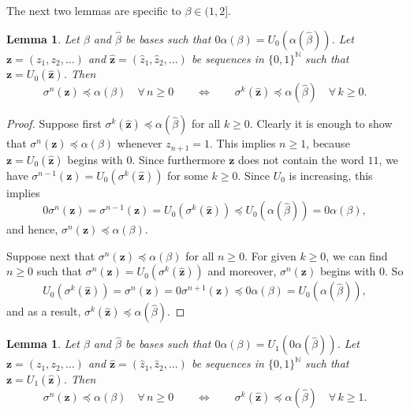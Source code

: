 \documentclass[11pt]{amsart}
\newtheorem{lemma}[theorem]{Lemma}
\theoremstyle{definition}
\theoremstyle{remark}
\numberwithin{equation}{section}
\newcommand{\N}{\ensuremath{\mathbb{N}}}
\newcommand{\z}{\mathbf{z}}
\newcommand{\al}{\alpha}
\newcommand{\lle}{\preccurlyeq}
\newcommand{\si}{\sigma}
\begin{document}
{The next two lemmas are specific to $\beta\in(1,2]$.}

\begin{lemma} \label{lem:upper-bound-equivalence-xi}
Let $\beta$ and $\hat{\beta}$ be bases such that $0\al(\beta)=U_0(\al(\hat{\beta}))$.
Let $\z=(z_1,z_2,\dots)$ and $\hat{\z}=(\hat{z}_1,\hat{z}_2,\dots)$ be sequences in $\{0,1\}^\N$ such that $\z=U_0(\hat{\z})$. Then
\[
\si^n(\z)\lle\alpha(\beta) \quad \forall\,n\geq 0 \qquad \Longleftrightarrow \qquad \si^k(\hat{\z})\lle\alpha(\hat{\beta}) \quad \forall\,k\geq 0.
\]
\end{lemma}

\begin{proof}
Suppose first $\si^k(\hat{\z})\lle\alpha(\hat{\beta})$ for all $k\geq 0$. Clearly it is enough to show that $\si^n(\z)\lle\alpha(\beta)$ whenever $z_{n+1}=1$. This implies $n\geq 1$, because $\z=U_0(\hat{\z})$ begins with $0$. Since furthermore $\z$ does not contain the word $11$, we have $\si^{n-1}(\z)=U_0(\si^k(\hat{\z}))$ for some $k\geq 0$. Since $U_0$ is increasing, this implies
\[
0\si^n(\z)=\si^{n-1}(\z)=U_0(\si^k(\hat{\z}))\lle U_0(\al(\hat{\beta}))=0\al(\beta),
\]
and hence, $\si^n(\z)\lle \al(\beta)$.

Suppose next that $\si^n(\z)\lle\alpha(\beta)$ for all $n\geq 0$. For given $k\geq 0$, we can find $n\geq 0$ such that $\sigma^n(\z)=U_0(\sigma^k(\hat{\z}))$ and moreover, $\si^{n}(\z)$ begins with $0$. So
\[
U_0(\si^k(\hat{\z}))=\si^n(\z)=0\si^{n+1}(\z)\lle 0\alpha(\beta)=U_0(\alpha(\hat{\beta})),
\]
and as a result, $\si^k(\hat{\z})\lle\alpha(\hat{\beta})$.
\end{proof}

\begin{lemma} \label{lem:upper-bound-equivalence-eta}
Let $\beta$ and $\hat{\beta}$ be bases such that $0\al(\beta)=U_1(0\al(\hat{\beta}))$.
Let $\z=(z_1,z_2,\dots)$ and $\hat{\z}=(\hat{z}_1,\hat{z}_2,\dots)$ be sequences in $\{0,1\}^\N$ such that $\z=U_1(\hat{\z})$. Then
\[
\si^n(\z)\lle\alpha(\beta) \quad \forall\,n\geq 0 \qquad \Longleftrightarrow \qquad \si^k(\hat{\z})\lle\alpha(\hat{\beta}) \quad \forall\,k\geq 1.
\]
\end{lemma}

\end{document}
